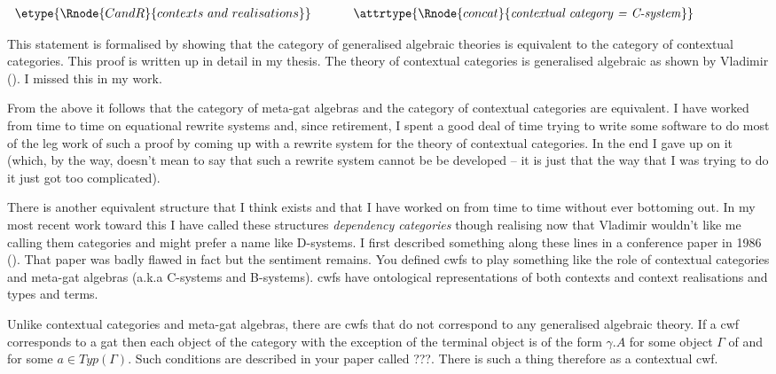 \begin{center}
$
\begin{array}{ c p{0.5cm} c}
\etype{\Rnode{CandR}{contexts\ and\ realisations}}   & & \attrtype{\Rnode{concat}{\mbox{\textit{contextual category = C-system}}}}
\end{array}                     
$
\setlength{\arrnodesepA}{7pt}
\setlength{\arrnodesepB}{7pt}
\end{center}

This statement is formalised by showing that the category of generalised algebraic theories 
is equivalent to the category of contextual categories. This proof is written up in detail
in my thesis. The theory of contextual categories is generalised algebraic as shown by Vladimir
(\cite{Cartmell2018A}). 
I missed this in my work. 

\note
From the above it follows that the category of meta-gat algebras and the category of contextual categories are equivalent. I have worked from time to time on equational rewrite systems and, since retirement, I spent a good deal of time trying to write some software to do most of the leg work of such a proof by coming up with a rewrite system for the theory of contextual categories. In the end I gave up on it (which, by the way, doesn't mean to say that such a rewrite system cannot be be developed  -- it is just that the way that I was trying to do it just got too complicated). 

\note 
There is another equivalent structure that I think exists and that I have worked on from time to time without ever bottoming out. In my most recent work toward this I have called these
structures \textit{dependency categories} though realising now that Vladimir wouldn't like me calling them categories and might prefer a name like D-systems. I first described something along these lines in a conference paper in 1986 (\cite{Cartmell86B}). That paper was badly flawed in fact but the sentiment remains. 
\note You defined cwfs to play something like the role of contextual categories and meta-gat algebras (a.k.a C-systems and B-systems). cwfs have ontological representations of both contexts and context realisations and types and terms. 


Unlike contextual categories and meta-gat algebras, there are cwfs that do not correspond to
any generalised algebraic theory. If a cwf corresponds to a gat then each object of the category \catcw with the exception of the terminal object is of the form $\gamma.A$ for some object $\Gamma$ of \catcw and for some $a \in Typ(\Gamma)$. Such conditions are described in your paper called ???. There is such a thing therefore as a contextual cwf. 

